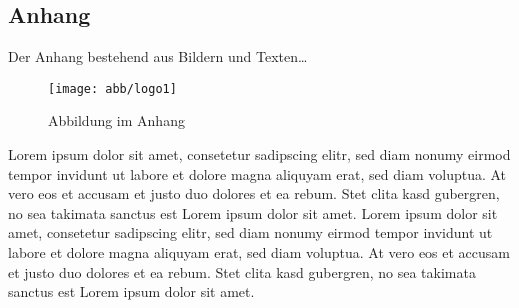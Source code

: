 \subsection*{Anhang}\label{anhang}

Der Anhang bestehend aus Bildern und Texten\ldots{}

\begin{figure}[htb]
    \centering{}
    \texttt{[image: abb/logo1]}
    \caption[Abbildung im Anhang]{Abbildung im Anhang}
    \label{fig:Abbildung im Anhang}
\end{figure}

Lorem ipsum dolor sit amet, consetetur sadipscing elitr, sed diam nonumy eirmod tempor invidunt ut labore et dolore magna aliquyam erat, sed diam voluptua. At vero eos et accusam et justo duo dolores et ea rebum. Stet clita kasd gubergren, no sea takimata sanctus est Lorem ipsum dolor sit amet. Lorem ipsum dolor sit amet, consetetur sadipscing elitr, sed diam nonumy eirmod tempor invidunt ut labore et dolore magna aliquyam erat, sed diam voluptua. At vero eos et accusam et justo duo dolores et ea rebum. Stet clita kasd gubergren, no sea takimata sanctus est Lorem ipsum dolor sit amet.
